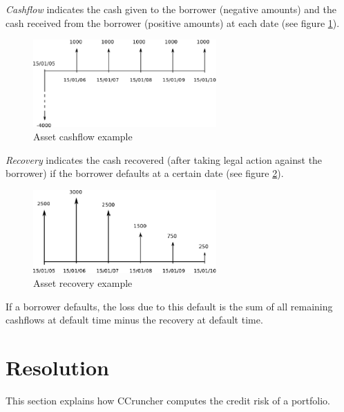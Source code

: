 \documentclass[a4paper,12pt,final]{article}
\begin{document}
\emph{Cashflow} indicates the cash given to the borrower (negative amounts) and the
cash received from the borrower (positive amounts) at each date (see figure \ref{cashflow}).

\begin{figure}[!hbt]
\begin{center}
\includegraphics[width=7cm, angle=0]{./images/cashflow.eps}
\caption{Asset cashflow example}
\label{cashflow}
\end{center}
\end{figure}
\FloatBarrier

\emph{Recovery} indicates the cash recovered (after taking legal action against the 
borrower) if the borrower defaults at a certain date (see figure \ref{recovery}).

\begin{figure}[!hbt]
\begin{center}
\includegraphics[width=7cm, angle=0]{./images/recovery.eps}
\caption{Asset recovery example}
\label{recovery}
\end{center}
\end{figure}
\FloatBarrier

If a borrower defaults, the loss due to this default is the sum of all remaining
cashflows at default time minus the recovery at default time.


\clearpage
\section{Resolution}

This section explains how CCruncher computes the credit risk of a portfolio.
\end{document}
